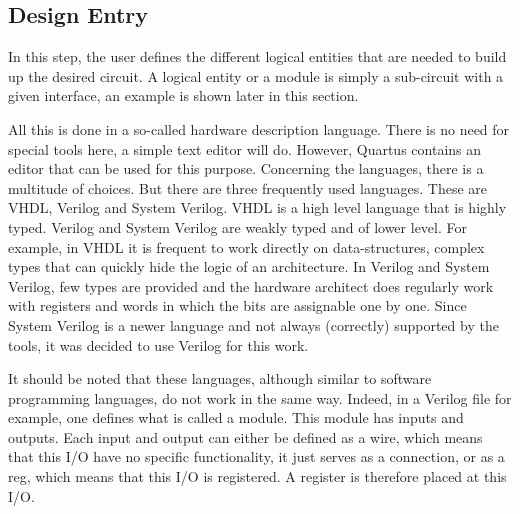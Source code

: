 \subsection{Design Entry}

In this step, the user defines the different logical entities that are needed to build up the 
desired circuit. A logical entity or a module is simply a sub-circuit with a given interface, an
example is shown later in this section.

All this is done in a so-called hardware description language. There is no need for special tools 
here, a simple text editor will do. However, Quartus contains an editor that can be used for this 
purpose. Concerning the languages, there is a multitude of choices. But there are three frequently used 
languages. These are VHDL, Verilog and System Verilog. VHDL is a high level language that is highly typed.
Verilog and System Verilog are weakly typed and of lower level. For example, in VHDL it is 
frequent to work directly on data-structures, complex types that can quickly hide the logic of an 
architecture. In Verilog and System Verilog, few types are provided and the hardware architect does 
regularly work with registers and words in which the bits are assignable one by one. Since System 
Verilog is a newer language and not always (correctly) supported by the tools, it was decided to use 
Verilog for this work. 

It should be noted that these languages, although similar to software programming languages, do not 
work in the same way. Indeed, in a Verilog file for example, one defines what is called a module. 
This module has inputs and outputs. Each input and output can either be defined as a wire, 
which means that this I/O have no specific functionality, it just serves as a connection, or 
as a reg, which means that this I/O is registered. A register is therefore placed at this I/O. 

